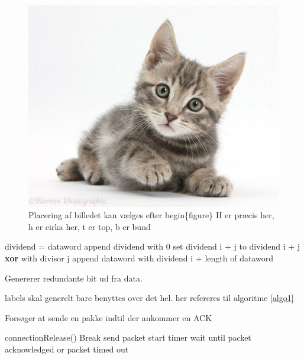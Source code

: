 \documentclass[a4paper,11pt,danish,oneside]{article}
\begin{document}
\begin{figure}[H]
	\centering
	\includegraphics[scale=0.2]{2}
	\caption{Placering af billedet kan vælges efter  begin\{figure\} H er præcis her, h er cirka her, t er top, b er bund}
\end{figure}



\begin{algorithm}[h]
	\begin{algorithmic}[1]
		\State dividend = dataword
		\State append dividend with 0 
		\EndFor
		\State set dividend i + j to dividend i + j \textbf{xor} with divisor j
		\EndFor
		\EndIf
		\EndFor
		\State append dataword with dividend i + length of dataword
		\EndFor
		\EndProcedure
	\end{algorithmic}
	\caption{Genererer redundante bit ud fra data.}
	\label{algo1}
\end{algorithm}

labels skal generelt bare benyttes over det hel. her refereres til algoritme \ref{algo1}

\begin{algorithm}[h]
	\caption{Forsøger at sende en pakke indtil der ankommer en ACK}
	\begin{algorithmic}[1]
		\State connectionRelease()
		\State Break
		\EndIf
		\State send packet
		\State start timer
		\State wait until packet acknowledged or packet timed out
		\EndWhile
		\EndProcedure
	\end{algorithmic}
\end{algorithm}
\end{document}
